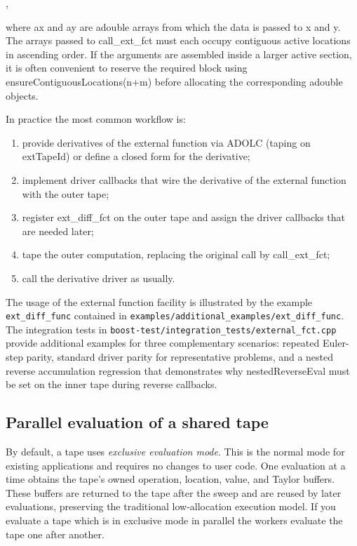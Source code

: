 \documentclass[11pt,twoside]{article}
\begin{document}
\noindent
\hspace*{2cm}{\sf rc=call\_ext\_fct(edf, n, ax, m, ay);},
\medskip

\noindent
where {\sf ax} and {\sf ay} are {\sf adouble} arrays from which the data is passed to {\sf x} and {\sf y}.
The arrays passed to {\sf call\_ext\_fct} must each occupy contiguous active
locations in ascending order. If the arguments are assembled inside a larger
active section, it is often convenient to reserve the required block using
{\sf ensureContiguousLocations(n+m)} before allocating the corresponding
{\sf adouble} objects.

\medskip

\noindent
In practice the most common workflow is:
\begin{enumerate}
\item provide derivatives of the external function via ADOLC (taping on extTapeId) or define a closed form for the derivative;
\item implement driver callbacks that wire the derivative of the external function with the outer tape;
\item register {\sf ext\_diff\_fct} on the outer tape and assign the driver
callbacks that are needed later;
\item tape the outer computation, replacing the original call by
{\sf call\_ext\_fct};
\item call the derivative driver as usually.
\end{enumerate}

\noindent
The usage of the external function facility is illustrated by the
example \verb=ext_diff_func= contained in \verb=examples/additional_examples/ext_diff_func=. The integration tests in
\verb=boost-test/integration_tests/external_fct.cpp= provide additional
examples for three complementary scenarios: repeated Euler-step parity,
standard driver parity for representative problems, and a nested reverse
accumulation regression that demonstrates why {\sf nestedReverseEval} must be
set on the inner tape during reverse callbacks.

%
\subsection{Parallel evaluation of a shared tape}
\label{parallel_tape_evaluation}
%
By default, a tape uses \emph{exclusive evaluation mode}. This is the normal
mode for existing applications and requires no changes to user code. One
evaluation at a time obtains the tape's owned operation, location, value, and
Taylor buffers. These buffers are returned to the tape after the sweep and are
reused by later evaluations, preserving the traditional low-allocation
execution model. If you evaluate a tape which is in exclusive mode in parallel
the workers evaluate the tape one after another.
\end{document}
